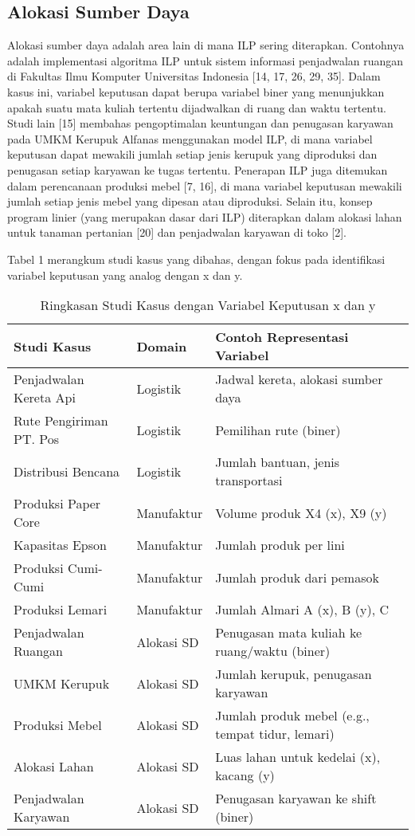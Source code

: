 \documentclass{IEEEtran}
\begin{document}
\subsection{Alokasi Sumber Daya}

Alokasi sumber daya adalah area lain di mana ILP sering diterapkan. Contohnya adalah implementasi algoritma ILP untuk sistem informasi penjadwalan ruangan di Fakultas Ilmu Komputer Universitas Indonesia [14, 17, 26, 29, 35]. Dalam kasus ini, variabel keputusan dapat berupa variabel biner yang menunjukkan apakah suatu mata kuliah tertentu dijadwalkan di ruang dan waktu tertentu. Studi lain [15] membahas pengoptimalan keuntungan dan penugasan karyawan pada UMKM Kerupuk Alfanas menggunakan model ILP, di mana variabel keputusan dapat mewakili jumlah setiap jenis kerupuk yang diproduksi dan penugasan setiap karyawan ke tugas tertentu. Penerapan ILP juga ditemukan dalam perencanaan produksi mebel [7, 16], di mana variabel keputusan mewakili jumlah setiap jenis mebel yang dipesan atau diproduksi. Selain itu, konsep program linier (yang merupakan dasar dari ILP) diterapkan dalam alokasi lahan untuk tanaman pertanian [20] dan penjadwalan karyawan di toko [2].

Tabel 1 merangkum studi kasus yang dibahas, dengan fokus pada identifikasi variabel keputusan yang analog dengan x dan y.

\begin{table}[h!]
    \centering
    \caption{Ringkasan Studi Kasus dengan Variabel Keputusan x dan y}
    \label{tab:case_studies}
    \begin{tabular}{@{}lll@{}}
        \toprule
        Studi Kasus & Domain & Contoh Representasi Variabel \\
        \midrule
        Penjadwalan Kereta Api & Logistik & Jadwal kereta, alokasi sumber daya \\
        Rute Pengiriman PT. Pos & Logistik & Pemilihan rute (biner) \\
        Distribusi Bencana & Logistik & Jumlah bantuan, jenis transportasi \\
        Produksi Paper Core & Manufaktur & Volume produk X4 (x), X9 (y) \\
        Kapasitas Epson & Manufaktur & Jumlah produk per lini \\
        Produksi Cumi-Cumi & Manufaktur & Jumlah produk dari pemasok \\
        Produksi Lemari & Manufaktur & Jumlah Almari A (x), B (y), C \\
        Penjadwalan Ruangan & Alokasi SD & Penugasan mata kuliah ke ruang/waktu (biner) \\
        UMKM Kerupuk & Alokasi SD & Jumlah kerupuk, penugasan karyawan \\
        Produksi Mebel & Alokasi SD & Jumlah produk mebel (e.g., tempat tidur, lemari) \\
        Alokasi Lahan & Alokasi SD & Luas lahan untuk kedelai (x), kacang (y) \\
        Penjadwalan Karyawan & Alokasi SD & Penugasan karyawan ke shift (biner) \\
        \bottomrule
    \end{tabular}
\end{table}
\end{document}
